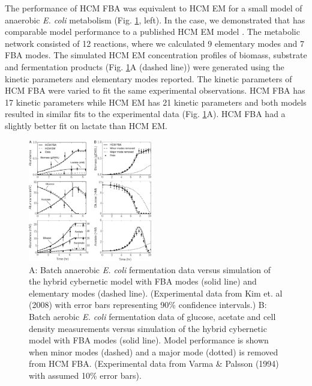 \documentclass[10pt,twocolumn,twoside,final]{IEEEtran}
\begin{document}
The performance of HCM FBA was equivalent to HCM EM for a small model of anaerobic \textit{E. coli} metabolism (Fig. \ref{fig:ecoli}, left).
In the  case, we demonstrated that  has comparable model performance to a published HCM EM model \cite{2008_kim_varner_ramkrishna_BiotechProg}.
The metabolic network consisted of 12 reactions, where we calculated 9 elementary modes and 7 FBA modes.
The simulated HCM EM concentration profiles of biomass, substrate and fermentation products (Fig. \ref {fig:ecoli}A (dashed line)) were generated using the kinetic parameters and elementary modes reported\cite{2008_kim_varner_ramkrishna_BiotechProg}.
The kinetic parameters of HCM FBA were varied to fit the same experimental observations.
HCM FBA has 17 kinetic parameters while HCM EM has 21 kinetic parameters and both models resulted in similar fits to the experimental data (Fig. \ref {fig:ecoli}A).
HCM FBA had a slightly better fit on lactate than HCM EM.

\begin{figure}[!t]\centering
\includegraphics[width=0.48\textwidth]{./figs/Fig-2-Ecoli-SimulationResults.pdf}
\caption{A: Batch anaerobic \textit{E. coli} fermentation data versus simulation of the hybrid cybernetic model with FBA modes (solid line) and elementary modes (dashed line). (Experimental data from Kim et. al (2008)\cite{2008_kim_varner_ramkrishna_BiotechProg} with error bars representing 90\% confidence intervals.) B: Batch aerobic \textit{E. coli} fermentation data of glucose, acetate and cell density measurements versus simulation of the hybrid cybernetic model with FBA modes (solid line). Model performance is shown when minor modes (dashed) and a major mode (dotted) is removed from HCM FBA. (Experimental data from Varma \& Palsson (1994)\cite{1994_varma_palsson_ApplEnvMicro} with assumed 10\% error bars).}
\label{fig:ecoli}
\end{figure}
\end{document}
